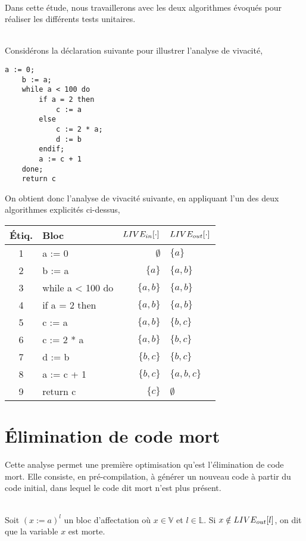 \documentclass[a4paper, 10pt]{article}
\begin{document}
\\
Dans cette étude, nous travaillerons avec les deux algorithmes évoqués pour réaliser les différents tests unitaires.
\\
\\
\begin{example}
Considérons la déclaration suivante pour illustrer l'analyse de vivacité,
\begin{lstlisting}[tabsize=2]
	a := 0;
	b := a;
	while a < 100 do
		if a = 2 then
			c := a
		else
			c := 2 * a;
			d := b
		endif;
		a := c + 1
	done;
	return c
\end{lstlisting}
On obtient donc l'analyse de vivacité suivante, en appliquant l'un des deux algorithmes explicités ci-dessus,
\\
\begin{center}
	\begin{tabular}{||c|l|r|l||}
	\hline
	Étiq. & Bloc & $LIVE_{in}[\cdot]$ & $LIVE_{out}[\cdot]$ \\
	\hline
	1 & a := 0 & $\emptyset$ & $\{a\}$\\
	2 & b := a & $\{a\}$ & $\{a, b\}$\\
	3 & while a < 100 do & $\{a, b\}$ & $\{a, b\}$\\
	4 & if a = 2 then & $\{a, b\}$ & $\{a, b\}$\\
	5 & c := a & $\{a, b\}$ & $\{b, c\}$\\
	6 & c := 2 * a & $\{a, b\}$ & $\{b, c\}$\\
	7 & d := b & $\{b, c\}$ & $\{b, c\}$\\
	8 & a := c + 1 & $\{b, c\}$ & $\{a, b, c\}$\\
	9 & return c & $\{c\}$ & $\emptyset$\\
	\hline
	\end{tabular}
\end{center}
\end{example}
\section{Élimination de code mort}
Cette analyse permet une première optimisation qu'est l'élimination de code mort. Elle consiste, en pré-compilation,
à générer un nouveau code à partir du code initial, dans lequel le code dit mort n'est plus présent.
\\
\\
\begin{definition}
	Soit $(x := a)^l$ un bloc d'affectation où $x \in \mathbb{V}$ et $l \in \mathbb{L}$. Si $x \notin LIVE_{out}[l]$, on dit que la variable $x$ est morte.
\end{definition}
\end{document}
